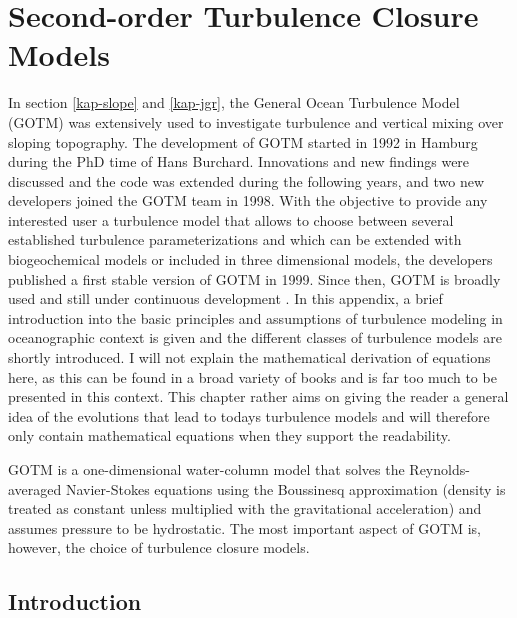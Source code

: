 \chapter{Second-order Turbulence Closure Models}

In section \ref{kap-slope} and \ref{kap-jgr}, the General Ocean Turbulence Model 
(GOTM) was extensively used to investigate turbulence and vertical mixing over 
sloping topography. The development of GOTM started in 1992 in Hamburg during 
the PhD time of Hans Burchard. Innovations and new findings were discussed and 
the code was extended during the following years, and two new developers joined 
the GOTM team in 1998. With the objective to provide any interested user a 
turbulence model that allows to choose between several established turbulence 
parameterizations and which can be extended with biogeochemical models or 
included in three dimensional models, the developers published a first stable 
version of GOTM in 1999. Since then, GOTM is broadly used and still under 
continuous development \citep[][]{gotm1999}. In this appendix, a brief 
introduction into the basic principles and assumptions of turbulence modeling in 
oceanographic context is given and the different classes of turbulence models 
are shortly introduced. I will not explain the mathematical derivation of 
equations here, as this can be found in a broad variety of books and is far too 
much to be presented in this context. This chapter rather aims on giving the 
reader a general idea of the evolutions that lead to todays turbulence models 
and will therefore only contain mathematical equations when they support the 
readability.

GOTM is a one-dimensional water-column model that solves the Reynolds-averaged 
Navier-Stokes equations using the Boussinesq approximation (density is treated 
as constant unless multiplied with the gravitational acceleration) and assumes 
pressure to be hydrostatic. The most important aspect of GOTM is, however, the 
choice of turbulence closure models.  

\section{Introduction}\label{introturbm}

